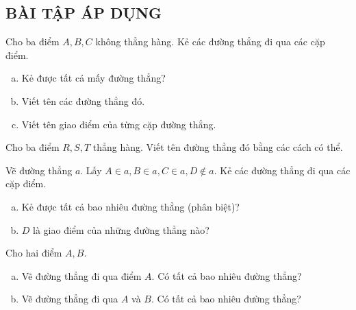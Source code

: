 \subsection{BÀI TẬP ÁP DỤNG}
\begin{bt}
Cho ba điểm $A, B, C$ không thẳng hàng. Kẻ các đường thẳng đi qua các cặp điểm.
\begin{enumerate}[a)]
\item	Kẻ được tất cả mấy đường thẳng?
\item	Viết tên các đường thẳng đó.
\item	Viết tên giao điểm của từng cặp đường thẳng.
\end{enumerate}
\end{bt}   \begin{bt}
Cho ba điểm $R, S, T$ thẳng hàng. Viết tên đường thẳng đó bằng các cách có thể.
\end{bt}   \begin{bt}
Vẽ đường thẳng $a$. Lấy $A  \in a, B \in a, C \in a, D \notin  a$. Kẻ các đường thẳng đi qua các cặp điểm.
\begin{enumerate}[a)]
\item	Kẻ được tất cả bao nhiêu đường thẳng (phân biệt)?
\item	$D$ là giao điểm của những đường thẳng nào?
\end{enumerate}
\end{bt}   \begin{bt}
Cho hai điểm $A, B$.
\begin{enumerate}[a)]
\item	Vẽ đường thẳng đi qua điểm $A$. Có tất cả bao nhiêu đường thẳng?
\item	Vẽ đường thẳng đi qua $A$ và $B$. Có tất cả bao nhiêu đường thẳng?
\end{enumerate}

\end{bt}
